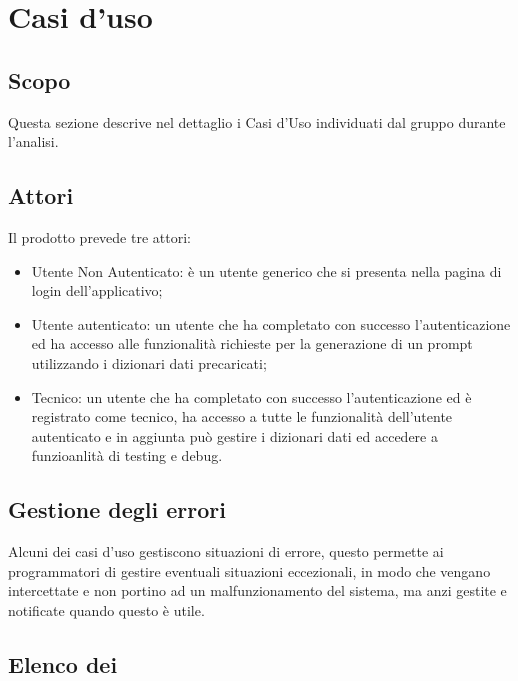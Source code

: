\section{Casi d'uso}

\subsection{Scopo}
Questa sezione descrive nel dettaglio i Casi d’Uso individuati dal gruppo durante l'analisi.

\subsection{Attori}
Il prodotto prevede tre attori:
\begin{itemize}
  \item Utente Non Autenticato: è un utente generico che si presenta nella pagina di login dell'applicativo;
  \item Utente autenticato: un utente che ha completato con successo l'autenticazione ed ha accesso alle funzionalità richieste per la generazione di un prompt utilizzando i dizionari dati precaricati;
  \item Tecnico: un utente che ha completato con successo l'autenticazione ed è registrato come tecnico, ha accesso a tutte le funzionalità dell'utente autenticato e in aggiunta può gestire i dizionari dati ed accedere a funzioanlità di testing e debug.
\end{itemize}

\subsection{Gestione degli errori}
Alcuni dei casi d'uso gestiscono situazioni di errore, questo permette ai programmatori di gestire eventuali situazioni eccezionali, in modo che vengano intercettate e non portino ad un malfunzionamento del sistema, ma anzi gestite e notificate quando questo è utile.

\subsection{Elenco dei }




















